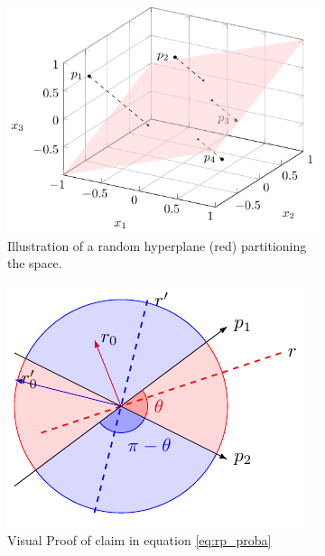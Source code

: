 \begin{figure}[b]
    \centering
    \begin{subfigure}[b]{0.45\textwidth}
        \centering
        \includegraphics[width=\textwidth]{tikz/random_projection.pdf}
        \caption{Illustration of a random hyperplane (red) partitioning the space.}
        \label{subfig:rp_3d}
    \end{subfigure}
    \hfill
    \begin{subfigure}[b]{0.45\textwidth}
        \centering
        \includegraphics[width=\textwidth]{tikz/random_hyperplane_2d.pdf}
        \caption{Visual Proof of claim in equation \ref{eq:rp_proba}}
        \label{subfig:rp_2d}
    \end{subfigure}
    \caption{}
    \label{fig:random_projection}
\end{figure}

